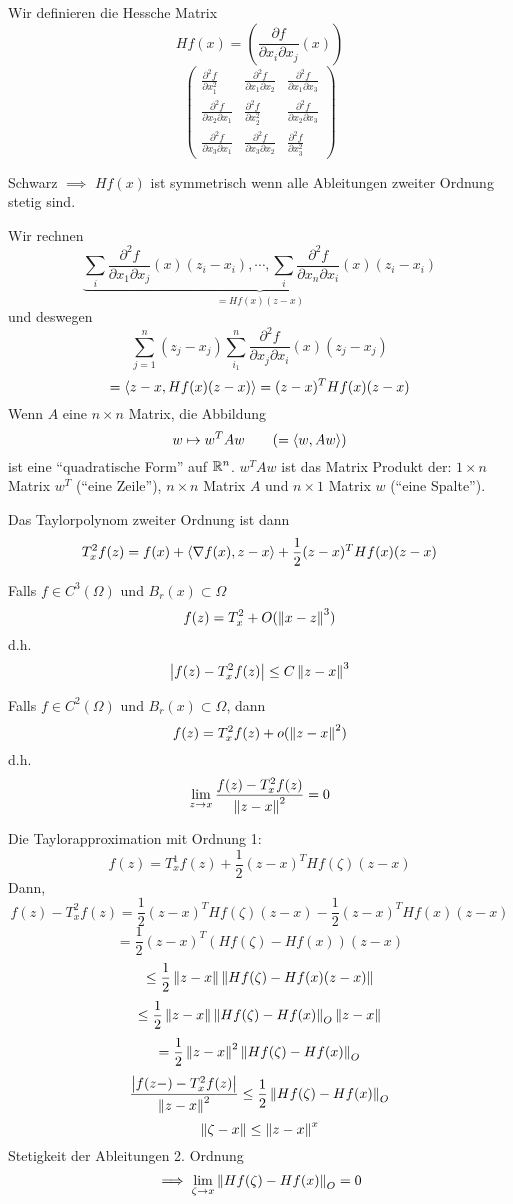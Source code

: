 Wir definieren die Hessche Matrix
\[Hf(x)=\left( \frac{\partial f}{\partial x_i\partial x_j}(x) \right)\]
\[ \begin{pmatrix}
  \frac{\partial^2 f}{\partial x_1^2} & \frac{\partial^2 f}{\partial x_1\partial x_2} & \frac{\partial^2 f}{\partial x_1\partial x_3} \\
  \frac{\partial^2 f}{\partial x_2\partial x_1} & \frac{\partial^2 f}{\partial x_2^2} & \frac{\partial^2 f}{\partial x_2\partial x_3} \\
  \frac{\partial^2 f}{\partial x_3\partial x_1} & \frac{\partial^2 f}{\partial x_3\partial x_2}& \frac{\partial^2 f}{\partial x_3^2}
\end{pmatrix}\]
\begin{Bem}
  Schwarz $\implies$ $Hf(x)$ ist symmetrisch wenn alle Ableitungen zweiter Ordnung stetig sind.
\end{Bem}
Wir rechnen
 \[\underbrace{\sum_i\frac{\partial^2 f}{\partial x_1\partial x_j}(x)(z_i-x_i),\cdots,\sum_i\frac{\partial^2 f}{\partial x_n\partial x_i}(x)(z_i-x_i)}_{=Hf(x)(z-x)}\]
und deswegen
  \[\sum^n_{j=1}(z_j-x_j)\sum^n_{i_1}\frac{\partial^2 f}{\partial x_j\partial x_i}(x)(z_j-x_j)\]
  \[=\langle z-x, Hf(x)(z-x) \rangle=(z-x)^THf(x)(z-x)\]
  Wenn $A$ eine $n\times n$ Matrix, die Abbildung
  \[w\mapsto w^T A w\qquad  (=\langle w,Aw \rangle)\]
  ist eine ``quadratische Form'' auf $\mathbb{R}^n$. $w^TAw$ ist das Matrix Produkt der:
$1\times n$ Matrix $w^T$ (``eine Zeile''), $n\times n$ Matrix $A$ und $n\times 1$ Matrix
$w$ (``eine Spalte'').

Das Taylorpolynom zweiter Ordnung ist dann
\[T^2_xf(z)=f(x)+\langle \nabla f(x), z-x \rangle+\frac{1}{2}(z-x)^T Hf(x)(z-x)\]
\begin{Kor}
  Falls $f\in C^3(\Omega)$ und $B_r(x)\subset\Omega$
  \[f(z)=T^2_x+O(\left\| x-z \right\|^3)\]
  d.h.
  \[\left| f(z)-T_x^2f(z) \right|\leq C\left\| z-x \right\|^3\]
\end{Kor}
\begin{Kor}
  Falls $f\in C^2(\Omega)$ und $B_r(x)\subset\Omega$, dann
  \[f(z)=T^2_xf(z)+o(\left\| z-x \right\|^2)\]
  d.h.
  \[\lim_{z\rightarrow x}\frac{f(z)-T_x^2f(z)}{\left\| z-x \right\|^2}=0\]
\end{Kor}
\begin{Bew}
Die Taylorapproximation mit Ordnung 1:
  \[f(z)=T^1_xf(z)+\frac{1}{2}(z-x)^THf(\zeta)(z-x)\]
Dann,
  \[f(z)-T_x^2f(z)=\frac{1}{2}(z-x)^THf(\zeta)(z-x)-\frac{1}{2}(z-x)^THf(x)(z-x)\]
  \[=\frac{1}{2}(z-x)^T(Hf(\zeta)-Hf(x))(z-x)\]
  \[\leq \frac{1}{2}\left\| z-x \right\|\left\| Hf(\zeta)-Hf(x)(z-x) \right\|\]
  \[\leq \frac{1}{2}\left\| z-x \right\|\left\| Hf(\zeta)-Hf(x) \right\|_O\left\| z-x \right\|\]
  \[= \frac{1}{2}\left\| z-x \right\|^2\left\| Hf(\zeta)-Hf(x) \right\|_O\]
  \[\frac{\left| f(z-)-T_x^2f(z) \right|}{\left\| z-x \right\|^2}\leq\frac{1}{2}\left\| Hf(\zeta)-Hf(x) \right\|_O\]
  \[\left\| \zeta-x \right\|\leq\left\| z-x \right\|^x\]
  Stetigkeit der Ableitungen 2. Ordnung
  \[\implies \lim_{\zeta\rightarrow x}\left\| Hf(\zeta)-Hf(x) \right\|_O=0\]
\end{Bew}
